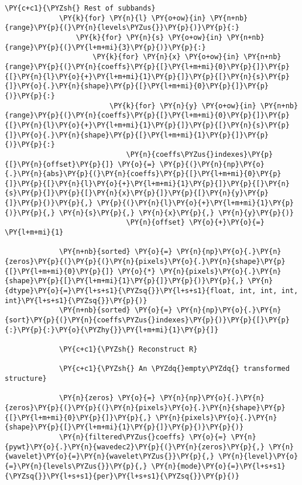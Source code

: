 \begin{Verbatim}[commandchars=\\\{\}]
             \PY{c+c1}{\PYZsh{} Rest of subbands}
             \PY{k}{for} \PY{n}{l} \PY{o+ow}{in} \PY{n+nb}{range}\PY{p}{(}\PY{n}{levels\PYZus{}}\PY{p}{)}\PY{p}{:}
                 \PY{k}{for} \PY{n}{s} \PY{o+ow}{in} \PY{n+nb}{range}\PY{p}{(}\PY{l+m+mi}{3}\PY{p}{)}\PY{p}{:}
                     \PY{k}{for} \PY{n}{x} \PY{o+ow}{in} \PY{n+nb}{range}\PY{p}{(}\PY{n}{coeffs}\PY{p}{[}\PY{l+m+mi}{0}\PY{p}{]}\PY{p}{[}\PY{n}{l}\PY{o}{+}\PY{l+m+mi}{1}\PY{p}{]}\PY{p}{[}\PY{n}{s}\PY{p}{]}\PY{o}{.}\PY{n}{shape}\PY{p}{[}\PY{l+m+mi}{0}\PY{p}{]}\PY{p}{)}\PY{p}{:}
                         \PY{k}{for} \PY{n}{y} \PY{o+ow}{in} \PY{n+nb}{range}\PY{p}{(}\PY{n}{coeffs}\PY{p}{[}\PY{l+m+mi}{0}\PY{p}{]}\PY{p}{[}\PY{n}{l}\PY{o}{+}\PY{l+m+mi}{1}\PY{p}{]}\PY{p}{[}\PY{n}{s}\PY{p}{]}\PY{o}{.}\PY{n}{shape}\PY{p}{[}\PY{l+m+mi}{1}\PY{p}{]}\PY{p}{)}\PY{p}{:}
                             \PY{n}{coeffs\PYZus{}indexes}\PY{p}{[}\PY{n}{offset}\PY{p}{]} \PY{o}{=} \PY{p}{(}\PY{n}{np}\PY{o}{.}\PY{n}{abs}\PY{p}{(}\PY{n}{coeffs}\PY{p}{[}\PY{l+m+mi}{0}\PY{p}{]}\PY{p}{[}\PY{n}{l}\PY{o}{+}\PY{l+m+mi}{1}\PY{p}{]}\PY{p}{[}\PY{n}{s}\PY{p}{]}\PY{p}{[}\PY{n}{x}\PY{p}{]}\PY{p}{[}\PY{n}{y}\PY{p}{]}\PY{p}{)}\PY{p}{,} \PY{p}{(}\PY{n}{l}\PY{o}{+}\PY{l+m+mi}{1}\PY{p}{)}\PY{p}{,} \PY{n}{s}\PY{p}{,} \PY{n}{x}\PY{p}{,} \PY{n}{y}\PY{p}{)}
                             \PY{n}{offset} \PY{o}{+}\PY{o}{=} \PY{l+m+mi}{1}
         
             \PY{n+nb}{sorted} \PY{o}{=} \PY{n}{np}\PY{o}{.}\PY{n}{zeros}\PY{p}{(}\PY{p}{(}\PY{n}{pixels}\PY{o}{.}\PY{n}{shape}\PY{p}{[}\PY{l+m+mi}{0}\PY{p}{]} \PY{o}{*} \PY{n}{pixels}\PY{o}{.}\PY{n}{shape}\PY{p}{[}\PY{l+m+mi}{1}\PY{p}{]}\PY{p}{)}\PY{p}{,} \PY{n}{dtype}\PY{o}{=}\PY{l+s+s1}{\PYZsq{}}\PY{l+s+s1}{float, int, int, int, int}\PY{l+s+s1}{\PYZsq{}}\PY{p}{)}
             \PY{n+nb}{sorted} \PY{o}{=} \PY{n}{np}\PY{o}{.}\PY{n}{sort}\PY{p}{(}\PY{n}{coeffs\PYZus{}indexes}\PY{p}{)}\PY{p}{[}\PY{p}{:}\PY{p}{:}\PY{o}{\PYZhy{}}\PY{l+m+mi}{1}\PY{p}{]}
         
             \PY{c+c1}{\PYZsh{} Reconstruct R}
         
             \PY{c+c1}{\PYZsh{} An \PYZdq{}empty\PYZdq{} transformed structure}
         
             \PY{n}{zeros} \PY{o}{=} \PY{n}{np}\PY{o}{.}\PY{n}{zeros}\PY{p}{(}\PY{p}{(}\PY{n}{pixels}\PY{o}{.}\PY{n}{shape}\PY{p}{[}\PY{l+m+mi}{0}\PY{p}{]}\PY{p}{,} \PY{n}{pixels}\PY{o}{.}\PY{n}{shape}\PY{p}{[}\PY{l+m+mi}{1}\PY{p}{]}\PY{p}{)}\PY{p}{)}
             \PY{n}{filtered\PYZus{}coeffs} \PY{o}{=} \PY{n}{pywt}\PY{o}{.}\PY{n}{wavedec2}\PY{p}{(}\PY{n}{zeros}\PY{p}{,} \PY{n}{wavelet}\PY{o}{=}\PY{n}{wavelet\PYZus{}}\PY{p}{,} \PY{n}{level}\PY{o}{=}\PY{n}{levels\PYZus{}}\PY{p}{,} \PY{n}{mode}\PY{o}{=}\PY{l+s+s1}{\PYZsq{}}\PY{l+s+s1}{per}\PY{l+s+s1}{\PYZsq{}}\PY{p}{)}
         

\end{Verbatim}
